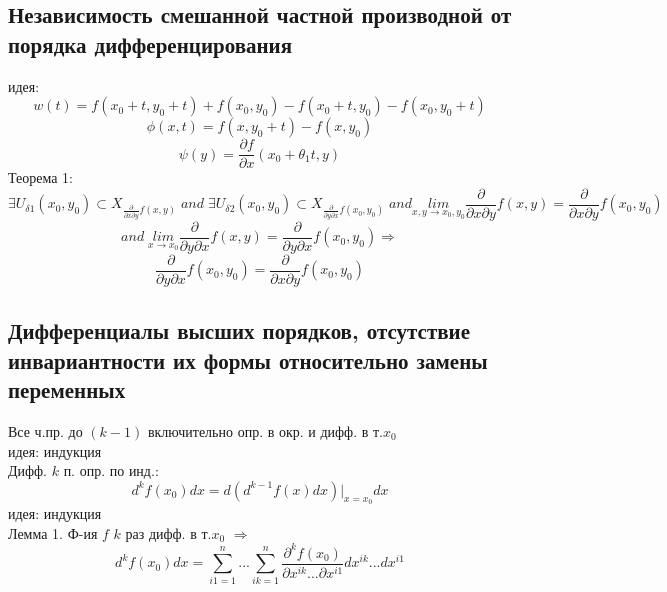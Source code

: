 \documentclass{article}
\begin{document}
\subsection{Независимость смешанной частной производной от порядка дифференцирования}
идея:  \\
\begin{equation*}
    w(t) = f(x_0+t, y_0+t) + f(x_0, y_0) - f(x_0+t, y_0) - f(x_0, y_0+t)
\end{equation*}
\begin{equation*}
    \phi (x, t) = f(x, y_0 + t) - f(x, y_0)
\end{equation*}
\begin{equation*}
    \psi(y) = \frac{\partial f}{\partial x} (x_0+\theta_1t, y)
\end{equation*}
Теорема 1:
\begin{equation*}
    \exists U_{\delta 1} (x_0, y_0) \subset X_{\frac{\partial}{\partial x \partial y} f(x,y)} \; and \; \exists U_{\delta 2} (x_0, y_0) \subset X_{\frac{\partial}{\partial y \partial x} f(x_0, y_0)} \; and \underset{x,y \rightarrow x_0,y_0}{lim} \frac{\partial}{\partial x \partial y} f(x,y) = \frac{\partial}{\partial x \partial y} f(x_0, y_0) \;
\end{equation*}
\begin{equation*}
    and \; \underset{x \rightarrow x_0}{lim} \frac{\partial}{\partial y \partial x} f(x, y) = \frac{\partial}{\partial y \partial x} f(x_0, y_0) \Rightarrow
\end{equation*}
\begin{equation*}
    \frac{\partial}{\partial y \partial x} f(x_0, y_0) = \frac{\partial}{\partial x \partial y} f(x_0, y_0)
\end{equation*}
\subsection{Дифференциалы высших порядков, отсутствие инвариантности их формы относительно замены переменных}
Все ч.пр. до $(k-1)$ включительно опр. в окр. и дифф. в т.$x_0$ \\
идея: индукция \\
Дифф. $k$ п. опр. по инд.:
\begin{equation*}
    d^k f(x_0) dx = d(d^{k-1} f(x) dx) \bigg |_{x=x_0} dx
\end{equation*}
идея: индукция \\
Лемма 1. Ф-ия $f$ $k$  раз дифф. в т.$x_0$ $\Rightarrow$
\begin{equation*}
    d^k f(x_0) dx = \sum_{i1=1}^n ... \sum_{ik=1}^n \frac{\partial ^k f(x_0)}{\partial x^{ik} ... \partial x^{i1}} dx^{ik} ... dx^{i1}
\end{equation*}
\end{document}
